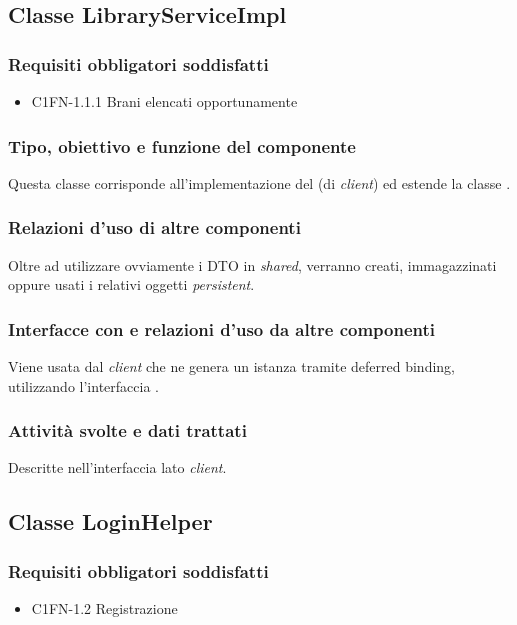 \subsection{Classe LibraryServiceImpl}
\subsubsection*{Requisiti obbligatori soddisfatti}
\begin{itemize}
	\item C1FN-1.1.1 Brani elencati opportunamente
\end{itemize}
\subsubsection*{Tipo, obiettivo e funzione del componente}
Questa classe corrisponde all'implementazione del  (di
\emph{client}) ed estende la classe .

\subsubsection*{Relazioni d'uso di altre componenti}
Oltre ad utilizzare ovviamente i DTO in \emph{shared}, verranno creati,
immagazzinati oppure usati i relativi oggetti \emph{persistent}.

\subsubsection*{Interfacce con e relazioni d'uso da altre componenti}
Viene usata dal \emph{client} che ne genera un istanza tramite deferred binding,
utilizzando l'interfaccia .

\subsubsection*{Attivit\`a svolte e dati trattati}
Descritte nell'interfaccia lato \emph{client}.

\subsection{Classe LoginHelper}
\subsubsection*{Requisiti obbligatori soddisfatti}
\begin{itemize}
	\item C1FN-1.2 Registrazione
\end{itemize}
